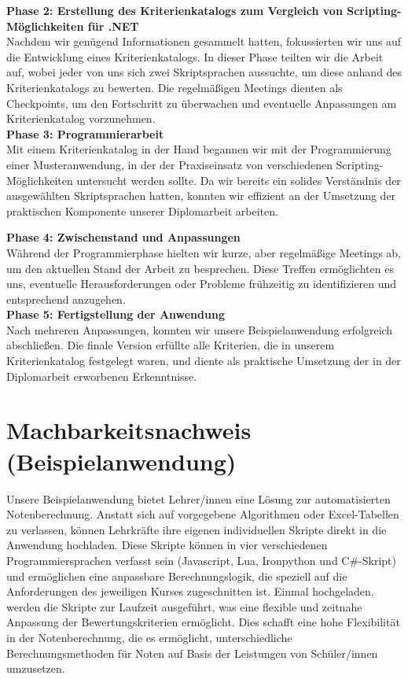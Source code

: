 \textbf{Phase 2: Erstellung des Kriterienkatalogs zum Vergleich von Scripting-Möglichkeiten für .NET}\\
Nachdem wir genügend Informationen gesammelt hatten, fokussierten wir uns auf 
die Entwicklung eines Kriterienkatalogs. In dieser Phase teilten wir die Arbeit auf, 
wobei jeder von uns sich zwei Skriptsprachen aussuchte, um diese anhand des 
Kriterienkatalogs zu bewerten. Die regelmäßigen Meetings dienten als Checkpoints, 
um den Fortschritt zu überwachen und eventuelle Anpassungen am Kriterienkatalog vorzunehmen.\\

\textbf{Phase 3: Programmierarbeit}\\
Mit einem Kriterienkatalog in der Hand begannen wir mit der 
Programmierung einer Musteranwendung, in der der Praxiseinsatz von verschiedenen 
Scripting-Möglichkeiten untersucht werden sollte. Da wir bereits ein solides Verständnis 
der ausgewählten Skriptsprachen hatten, konnten wir effizient an der Umsetzung der praktischen 
Komponente unserer Diplomarbeit arbeiten.

\newpage

\textbf{Phase 4: Zwischenstand und Anpassungen}\\
Während der Programmierphase hielten wir kurze, aber regelmäßige Meetings ab, 
um den aktuellen Stand der Arbeit zu besprechen. Diese Treffen ermöglichten es uns, 
eventuelle Herausforderungen oder Probleme frühzeitig zu identifizieren und 
entsprechend anzugehen.\\

\textbf{Phase 5: Fertigstellung der Anwendung}\\
Nach mehreren Anpassungen, konnten wir unsere Beispielanwendung 
erfolgreich abschließen. Die finale Version erfüllte alle Kriterien, die in 
unserem Kriterienkatalog festgelegt waren, und diente als praktische Umsetzung 
der in der Diplomarbeit erworbenen Erkenntnisse.


\newpage
\section{Machbarkeitsnachweis (Beispielanwendung)}

Unsere Beispielanwendung bietet Lehrer/innen eine Lösung zur automatisierten Notenberechnung. 
Anstatt sich auf vorgegebene Algorithmen oder Excel-Tabellen zu verlassen, 
können Lehrkräfte ihre eigenen individuellen Skripte direkt in die Anwendung hochladen. 
Diese Skripte können in vier verschiedenen Programmiersprachen verfasst sein 
(Javascript, Lua, Ironpython und C\#-Skript) und ermöglichen eine anpassbare Berechnungslogik, 
die speziell auf die Anforderungen des jeweiligen Kurses zugeschnitten ist. Einmal hochgeladen, 
werden die Skripte zur Laufzeit ausgeführt, was eine flexible und zeitnahe Anpassung der 
Bewertungskriterien ermöglicht. Dies schafft eine hohe Flexibilität in der Notenberechnung, 
die es ermöglicht, unterschiedliche Berechnungsmethoden für Noten auf Basis der Leistungen von
Schüler/innen umzusetzen.

